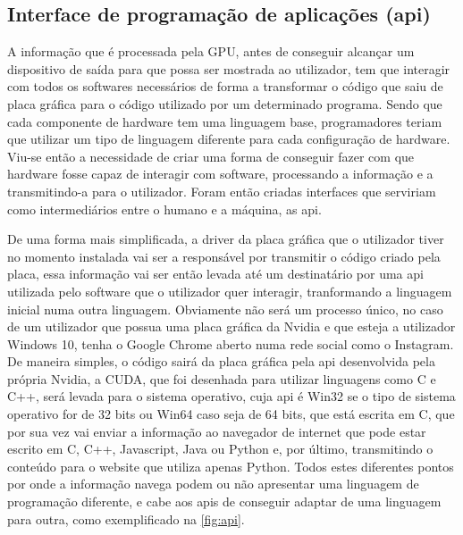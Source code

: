 \documentclass{report}
\begin{document}
\subsection{Interface de programação de aplicações (\acs{api})}
A informação que é processada pela GPU, antes de conseguir alcançar um dispositivo de saída para que possa ser mostrada ao utilizador, tem que interagir com todos os softwares necessários de forma a transformar o código que saiu de placa gráfica para o código utilizado por um determinado programa. Sendo que cada componente de hardware tem uma linguagem base, programadores teriam que utilizar um tipo de linguagem diferente para cada configuração de hardware. Viu-se então a necessidade de criar uma forma de conseguir fazer com que hardware fosse capaz de interagir com software, processando a informação e a transmitindo-a para o utilizador. Foram então criadas interfaces que serviriam como intermediários entre o humano e a máquina, as \acs{api}. \cite{api}

\vspace{5mm}De uma forma mais simplificada, a driver da placa gráfica que o utilizador tiver no momento instalada vai ser a responsável por transmitir o código criado pela placa, essa informação vai ser então levada até um destinatário por uma \acs{api} utilizada pelo software que o utilizador quer interagir, tranformando a linguagem inicial numa outra linguagem. Obviamente não será um processo único, no caso de um utilizador que possua uma placa gráfica da Nvidia e que esteja a utilizador Windows 10, tenha o Google Chrome aberto numa rede social como o Instagram. De maneira simples, o código sairá da placa gráfica pela \acs{api} desenvolvida pela própria Nvidia, a CUDA, que foi desenhada para utilizar linguagens como C e C++, será levada para o sistema operativo, cuja \acs{api} é Win32 se o tipo de sistema operativo for de 32 bits ou Win64 caso seja de 64 bits, que está escrita em C, que por sua vez vai enviar a informação ao navegador de internet que pode estar escrito em C, C++, Javascript, Java ou Python e, por último, transmitindo o conteúdo para o website que utiliza apenas Python. \newline
Todos estes diferentes pontos por onde a informação navega podem ou não apresentar uma linguagem de programação diferente, e cabe aos \acs{api}s de conseguir adaptar de uma linguagem para outra, como exemplificado na \autoref{fig:api}. \newline
\end{document}
